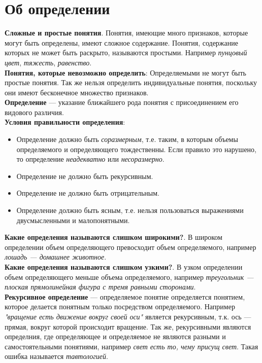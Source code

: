 \documentclass{article}
\begin{document}
\section{Об определении}
\textbf{Сложные и простые понятия}. Понятия, имеющие много признаков, которые могут быть определены, имеют сложное содержание. Понятия, содержание которых не может быть раскрыто, называются простыми. Например \textit{пунцовый цвет}, \textit{тяжесть}, \textit{равенство}.
\\
\textbf{Понятия, которые невозможно определить}: Определяемыми не могут быть простые понятия. Так же нельзя определить индивидуальные понятия, поскольку они имеют бесконечное множество признаков.
\\
\textbf{Определение} --- указание ближайшего рода понятия с присоединением его видового различия.
\\
\textbf{Условия правильности определения}: 
\begin{itemize}
\item Определение должно быть \textit{соразмерным}, т.е. таким, в которым объемы определяемого и определяющего тождественны. Если правило это нарушено, то определение \textit{неадекватно} или \textit{несоразмерно}.
\item Определение не должно быть рекурсивным.
\item Определение не должно быть отрицательным.
\item Определение должно быть ясным, т.е. нельзя пользоваться выражениями двусмысленными и малопонятными.
\end{itemize}
\textbf{Какие определения называются слишком широкими?}. В широком определении объем определяющего превосходит объем определяемого, например \textit{лошадь --- домашнее животное}. 
\\
\textbf{Какие определения называются слишком узкими?}. В узком определении объем определяющего меньше объема определяемого, например \textit{треугольник --- плоская прямолинейная фигура с тремя равными сторонами}.
\\
\textbf{Рекурсивное определение} --- определяемое понятие определяется понятием, которое делается понятным только посредством определяемого. Например \textit{"вращение есть движение вокруг своей оси"} является рекурсивным, т.к. ось --- прямая, вокруг которой происходит вращение. Так же, рекурсивными являются определния, где определяющее и определяемое не являются разными и самостоятельными понятиями, например \textit{свет есть то, чему присущ свет}. Такая ошибка называется \textit{тавтологией}.
\\
\end{document}
